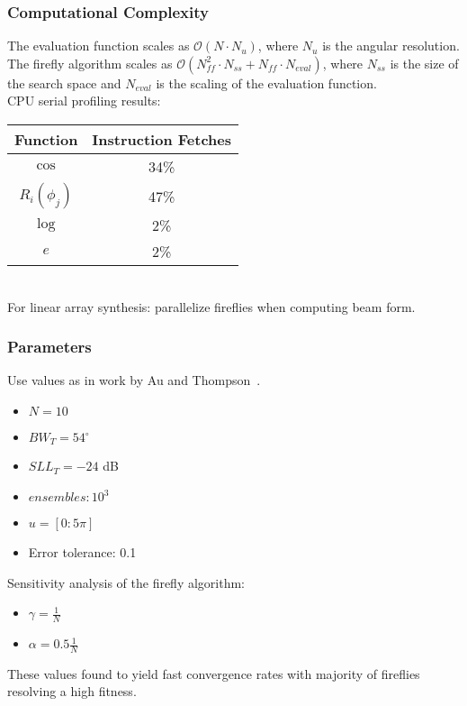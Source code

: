 \documentclass[...]{beamer}
\begin{document}
\begin{frame}
  \frametitle{Computational Complexity}

  The evaluation function scales as $\mathcal{O}\left(N \cdot N_u\right)$, where $N_u$ is the angular resolution.\\
  \vspace{3mm}
  The firefly algorithm scales as $\mathcal{O}\left(N_{f\!f}^2 \cdot N_{ss} + N_{f\!f} \cdot N_{eval}\right)$, where $N_{ss}$ is the size of the search space and $N_{eval}$ is the scaling of the evaluation function.\\
  \vspace{3mm}
  CPU serial profiling results:
  \vspace{2mm}

  \begin{minipage}{.9\linewidth}
    \centering
    \begin{tabular}{| c | c |}
      \hline
      Function & Instruction Fetches\\
      \hline
      $\cos$ & 34\%\\
      \hline
      $R_i(\phi_j)$ & 47\%\\
      \hline
      $\log$ & 2\%\\
      \hline
      $e$ & 2\%\\
      \hline
    \end{tabular}
    \label{table:CPUprofile}
  \end{minipage}\\
  \vspace{0.5mm}
  For linear array synthesis: parallelize fireflies when computing beam form.

\end{frame}
\begin{frame}
  \frametitle{Parameters}

  Use values as in work by Au and Thompson~\cite{Au2013}.

  \begin{itemize}
    \item $N = 10$
    \item $BW_T = 54^\circ$
    \item $SLL_T = -24$ dB
    \item $ensembles: 10^3$
    \item $u=[0:5\pi]$
    \item Error tolerance: 0.1
  \end{itemize}

  Sensitivity analysis of the firefly algorithm:

  \begin{itemize}
    \item $\gamma=\frac{1}{N}$
    \item $\alpha=0.5\frac{1}{N}$
  \end{itemize}

  These values found to yield fast convergence rates with majority of fireflies resolving a high fitness.

\end{frame}
\end{document}

